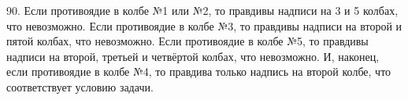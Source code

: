 90. Если противоядие в колбе №1 или №2, то правдивы надписи на 3 и 5 колбах, что невозможно. Если противоядие в колбе №3, то правдивы надписи на второй и пятой колбах, что невозможно. Если противоядие в колбе №5, то правдивы надписи на второй, третьей и четвёртой колбах, что невозможно. И, наконец, если противоядие в колбе №4, то правдива только надпись на второй колбе, что соответствует условию задачи.\\
